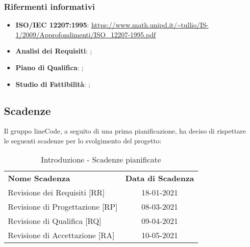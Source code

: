 	\subsubsection{Rifermenti informativi}
	\begin{itemize}
		\item \textbf{ISO/IEC 12207:1995}: \url{https://www.math.unipd.it/~tullio/IS-1/2009/Approfondimenti/ISO_12207-1995.pdf}
		\item \textbf{Analisi dei Requisiti}: ;
		\item \textbf{Piano di Qualifica}: ;
		\item \textbf{Studio di Fattibilità}: ; 
	\end{itemize}

\subsection{Scadenze}
	Il gruppo lineCode, a seguito di una prima pianificazione, ha deciso di rispettare le seguenti scadenze per lo svolgimento del progetto:
	\begin{table} [h!]
		\begin{center}
			\begin{tabular} { m{5.5cm} c }
				\rowcolor{lightgray}
				\textbf{Nome Scadenza} & \textbf{Data di Scadenza} \\ 
				Revisione dei Requisiti [RR] & 18-01-2021 \\ 
				Revisione di Progettazione [RP] & 08-03-2021 \\ 
				Revisione di Qualifica [RQ] & 09-04-2021 \\ 
				Revisione di Accettazione [RA] & 10-05-2021 \\
			\end{tabular}
			\caption{Introduzione - Scadenze pianificate}
		\end{center}
	\end{table}